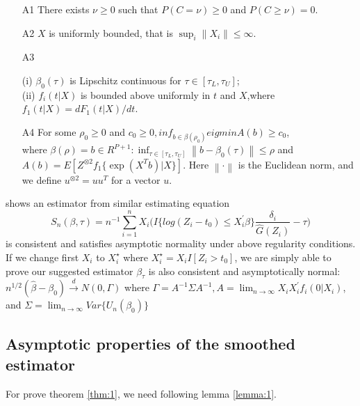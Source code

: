 \documentclass[titlepage,english,12pt]{article}
\begin{document}
	\begin{enumerate}
		\item[A1] There exists $\nu \ge 0$ such that $P(C = \nu) \ge 0$ and $P(C \ge \nu) =0$.
		\item[A2] $X$ is uniformly bounded, that is $\sup_i \left\lVert X_i \right\rVert \le \infty$. 
		\item[A3] 
		\begin{flushleft}
			(i) $\beta_0(\tau)$ is Lipschitz continuous for $\tau \in [\tau_L, \tau_U]$;\\
			(ii) $f_i(t|X)$ is bounded above uniformly in $t$ and $X$,where $f_1(t|X) = dF_1(t|X)/dt$.
		\end{flushleft}
		\item[A4] For some $\rho_0 \ge 0$ and $c_0 \ge 0, inf_{b \in \beta(\rho_0)} eigmin A(b) \geq c_0$,\\ where $\beta(\rho)={b\in R^{P+1} : \inf_{\tau \in [\tau_L, \tau_U]}
			\left\lVert b-\beta_0(\tau) \right\rVert \leq \rho}$ and $A(b) = E[Z^{\otimes2}f_1 \{\exp(X^T b)|X\}]$. Here $\left\lVert \cdot \right\rVert$ is the Euclidean norm, and we define $u^{\otimes2} = uu^T$ for a vector $u$.
	\end{enumerate}
	
	\noindent \citet{peng2009competing} shows an estimator from similar estimating equation
	\begin{equation} \label{eq:9}
	S_n(\beta, \tau)=n^{-1}\sum_{i=1}^{n}X_i \Big( I\{log(Z_i-t_0) \leq X_i^{\prime} \beta\} \frac{\delta_i}{\hat{G}(Z_i)}  -\tau \Big)
	\end{equation}
	\noindent is consistent and satisfies asymptotic normality under above regularity conditions. If we change first $X_i$ to $X_i^\star$ where $X_i^\star = X_i I[Z_i>t_0]$, we are simply able to prove our suggested estimator $\beta_\tau$ is also consistent and asymptotically normal:
	\begin{math}
	n^{1/2}(\hat{\beta}-\beta_0) \xrightarrow{d} N(0, \Gamma)
	\end{math}
	\noindent where $\Gamma = A^{-1} \Sigma A^{-1}, A = \lim_{n \rightarrow \infty} X_i X_i^{\prime}f_i(0|X_i)$, and $\Sigma = \lim_{n \rightarrow \infty} Var\{U_n(\beta_0)\}$
	
	
	\subsection{Asymptotic properties of the smoothed estimator}
	\noindent For prove theorem \ref{thm:1}, we need following lemma \ref{lemma:1}.\\
	
\end{document}
